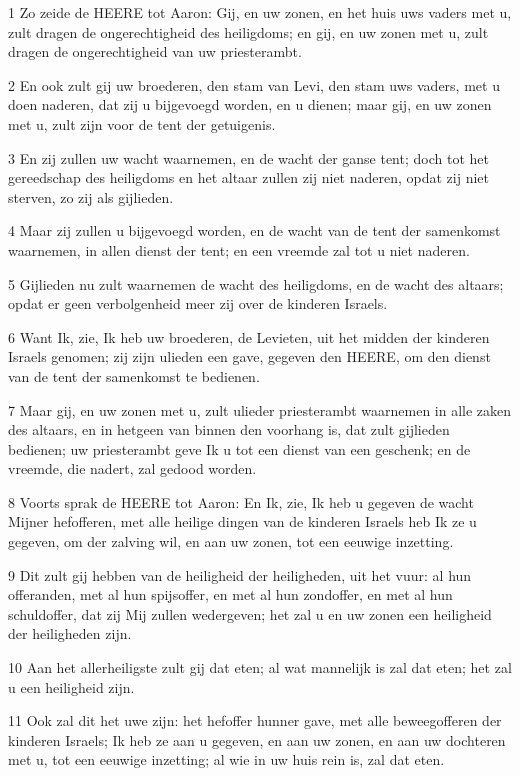 \par 1 Zo zeide de HEERE tot Aaron: Gij, en uw zonen, en het huis uws vaders met u, zult dragen de ongerechtigheid des heiligdoms; en gij, en uw zonen met u, zult dragen de ongerechtigheid van uw priesterambt.
\par 2 En ook zult gij uw broederen, den stam van Levi, den stam uws vaders, met u doen naderen, dat zij u bijgevoegd worden, en u dienen; maar gij, en uw zonen met u, zult zijn voor de tent der getuigenis.
\par 3 En zij zullen uw wacht waarnemen, en de wacht der ganse tent; doch tot het gereedschap des heiligdoms en het altaar zullen zij niet naderen, opdat zij niet sterven, zo zij als gijlieden.
\par 4 Maar zij zullen u bijgevoegd worden, en de wacht van de tent der samenkomst waarnemen, in allen dienst der tent; en een vreemde zal tot u niet naderen.
\par 5 Gijlieden nu zult waarnemen de wacht des heiligdoms, en de wacht des altaars; opdat er geen verbolgenheid meer zij over de kinderen Israels.
\par 6 Want Ik, zie, Ik heb uw broederen, de Levieten, uit het midden der kinderen Israels genomen; zij zijn ulieden een gave, gegeven den HEERE, om den dienst van de tent der samenkomst te bedienen.
\par 7 Maar gij, en uw zonen met u, zult ulieder priesterambt waarnemen in alle zaken des altaars, en in hetgeen van binnen den voorhang is, dat zult gijlieden bedienen; uw priesterambt geve Ik u tot een dienst van een geschenk; en de vreemde, die nadert, zal gedood worden.
\par 8 Voorts sprak de HEERE tot Aaron: En Ik, zie, Ik heb u gegeven de wacht Mijner hefofferen, met alle heilige dingen van de kinderen Israels heb Ik ze u gegeven, om der zalving wil, en aan uw zonen, tot een eeuwige inzetting.
\par 9 Dit zult gij hebben van de heiligheid der heiligheden, uit het vuur: al hun offeranden, met al hun spijsoffer, en met al hun zondoffer, en met al hun schuldoffer, dat zij Mij zullen wedergeven; het zal u en uw zonen een heiligheid der heiligheden zijn.
\par 10 Aan het allerheiligste zult gij dat eten; al wat mannelijk is zal dat eten; het zal u een heiligheid zijn.
\par 11 Ook zal dit het uwe zijn: het hefoffer hunner gave, met alle beweegofferen der kinderen Israels; Ik heb ze aan u gegeven, en aan uw zonen, en aan uw dochteren met u, tot een eeuwige inzetting; al wie in uw huis rein is, zal dat eten.
